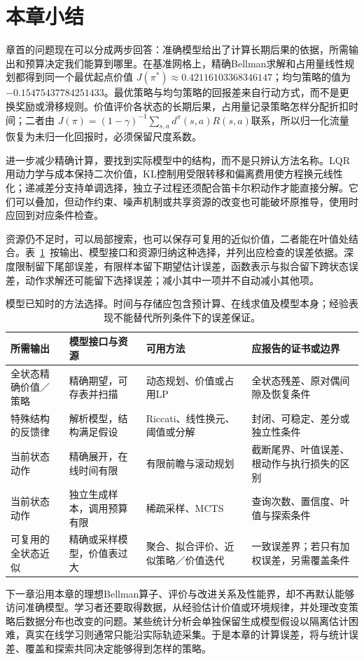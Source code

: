 \section{本章小结}
\label{sec:rl-planning-summary}

章首的问题现在可以分成两步回答：准确模型给出了计算长期后果的依据，所需输出和预算决定我们能算到哪里。在基准网格上，精确Bellman求解和占用量线性规划都得到同一个最优起点价值
$J(\pi^*)\approx0.42116103368346147$；均匀策略的值为
$-0.15475437784251433$。最优策略与均匀策略的回报差来自行动方式，而不是更换奖励或滑移规则。价值评价各状态的长期后果，占用量记录策略怎样分配折扣时间；二者由
$J(\pi)=(1-\gamma)^{-1}\sum_{s,a}d^\pi(s,a)R(s,a)$联系，所以归一化流量恢复为未归一化回报时，必须保留尺度系数。

进一步减少精确计算，要找到实际模型中的结构，而不是只辨认方法名称。LQR用动力学与成本保持二次价值，KL控制用受限转移和偏离费用使方程换元线性化；递减差分支持单调选择，独立子过程还须配合笛卡尔积动作才能直接分解。它们可以叠加，但动作约束、噪声机制或共享资源的改变也可能破坏原推导，使用时应回到对应条件检查。

资源仍不足时，可以局部搜索，也可以保存可复用的近似价值，二者能在叶值处结合。表~\ref{tab:rl-planning-method-choice}~按输出、模型接口和资源归纳这种选择，并列出应检查的误差依据。深度限制留下尾部误差，有限样本留下期望估计误差，函数表示与拟合留下跨状态误差，动作求解还可能留下选择误差；减小其中一项并不自动减小其他项。

\begin{table}[htbp]
 \centering
 \small
 \begin{tabularx}{\linewidth}{@{}l>{\raggedright\arraybackslash}X>{\raggedright\arraybackslash}X>{\raggedright\arraybackslash}X@{}}
  \toprule
  所需输出 & 模型接口与资源 & 可用方法 & 应报告的证书或边界\\
  \midrule
  全状态精确价值／策略 & 精确期望，可存表并扫描 & 动态规划、价值或占用LP & 全状态残差、原对偶间隙及恢复条件\\
  特殊结构的反馈律 & 解析模型，结构满足假设 & Riccati、线性换元、阈值或分解 & 封闭、可稳定、差分或独立性条件\\
  当前状态动作 & 精确展开，在线时间有限 & 有限前瞻与滚动规划 & 截断尾界、叶值误差、根动作与执行损失的区别\\
  当前状态动作 & 独立生成样本，调用预算有限 & 稀疏采样、MCTS & 查询次数、置信度、叶值与探索条件\\
  可复用的全状态近似 & 精确或采样模型，价值表过大 & 聚合、拟合评价、近似策略／价值迭代 & 一致误差界；若只有加权误差，另需覆盖条件\\
  \bottomrule
 \end{tabularx}
 \caption{模型已知时的方法选择。时间与存储应包含预计算、在线求值及模型本身；经验表现不能替代所列条件下的误差保证。}
 \label{tab:rl-planning-method-choice}
\end{table}

下一章沿用本章的理想Bellman算子、评价与改进关系及性能界，却不再默认能够访问准确模型。学习者还要取得数据，从经验估计价值或环境规律，并处理改变策略后数据分布也改变的问题。某些统计分析会单独保留生成模型假设以隔离估计困难，真实在线学习则通常只能沿实际轨迹采集。于是本章的计算误差，将与统计误差、覆盖和探索共同决定能够得到怎样的策略。
